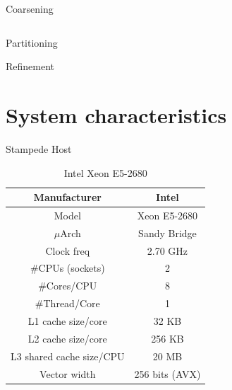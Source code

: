 \documentclass{beamer}
\begin{document}
\begin{frame}{Coarsening}
\begin{columns}[c]
  \end{columns}
\end{frame}



\begin{frame}{Partitioning}
  
\end{frame}

\begin{frame}{Refinement}
  
\end{frame}




\section{System characteristics}

\begin{frame}{Stampede Host}
\begin{table}[H]
\centering
\footnotesize
\begin{tabular}{| c | c |}\hline
Manufacturer & Intel\\ \hline
Model & Xeon E5-2680\\ \hline
$\mu$Arch & Sandy Bridge\\ \hline
Clock freq & 2.70 GHz\\ \hline
\#CPUs (sockets) & 2 \\ \hline
\#Cores/CPU & 8\\ \hline
\#Thread/Core & 1\\ \hline
L1 cache size/core & 32 KB\\ \hline
L2 cache size/core & 256 KB\\ \hline
L3 shared cache size/CPU & 20 MB\\ \hline
Vector width & 256 bits (AVX)\\ \hline
\end{tabular}
\caption{Intel Xeon E5-2680}
\end{table}
\end{frame}
\end{document}
